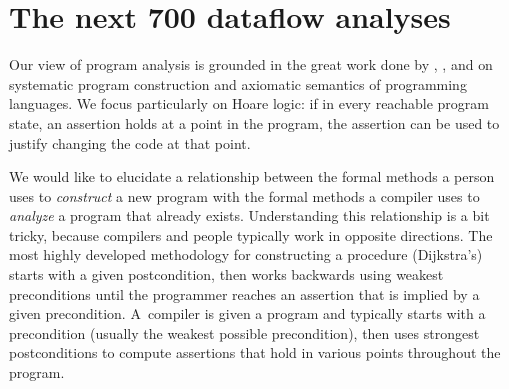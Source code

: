 \section{The next 700 dataflow analyses}






Our view of program analysis is grounded in the great work done by
\citet{floyd:???},
\citet{hoare:???},
and
\citet{dijkstra:discipline}
on systematic program construction and
axiomatic semantics of programming languages.
We focus particularly on Hoare logic:
if in every reachable program state, 
 an assertion holds at a point in the program,
the assertion can be used to justify changing the code at that point.

We would like to elucidate a relationship between the formal methods a
person uses to 
\emph{construct} a new program with the formal methods a compiler uses
to \emph{analyze} a program that already exists.
Understanding this relationship is a bit tricky, because compilers and
people typically work in opposite directions.
The most highly developed
methodology for constructing a procedure (Dijkstra's) starts with a
given postcondition, then works backwards using weakest
preconditions until the programmer reaches an assertion that is
implied by a given precondition.
A~compiler is given a program and typically starts with a precondition (usually the
weakest possible precondition), then uses strongest postconditions to
compute assertions that hold in various points throughout the program.

